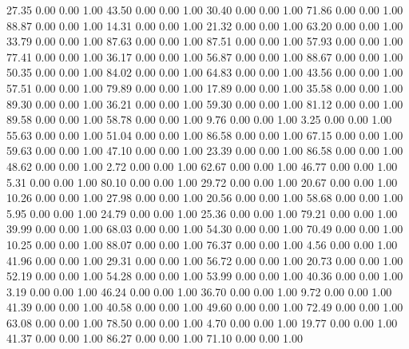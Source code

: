    27.35   0.00   0.00   1.00
   43.50   0.00   0.00   1.00
   30.40   0.00   0.00   1.00
   71.86   0.00   0.00   1.00
   88.87   0.00   0.00   1.00
   14.31   0.00   0.00   1.00
   21.32   0.00   0.00   1.00
   63.20   0.00   0.00   1.00
   33.79   0.00   0.00   1.00
   87.63   0.00   0.00   1.00
   87.51   0.00   0.00   1.00
   57.93   0.00   0.00   1.00
   77.41   0.00   0.00   1.00
   36.17   0.00   0.00   1.00
   56.87   0.00   0.00   1.00
   88.67   0.00   0.00   1.00
   50.35   0.00   0.00   1.00
   84.02   0.00   0.00   1.00
   64.83   0.00   0.00   1.00
   43.56   0.00   0.00   1.00
   57.51   0.00   0.00   1.00
   79.89   0.00   0.00   1.00
   17.89   0.00   0.00   1.00
   35.58   0.00   0.00   1.00
   89.30   0.00   0.00   1.00
   36.21   0.00   0.00   1.00
   59.30   0.00   0.00   1.00
   81.12   0.00   0.00   1.00
   89.58   0.00   0.00   1.00
   58.78   0.00   0.00   1.00
    9.76   0.00   0.00   1.00
    3.25   0.00   0.00   1.00
   55.63   0.00   0.00   1.00
   51.04   0.00   0.00   1.00
   86.58   0.00   0.00   1.00
   67.15   0.00   0.00   1.00
   59.63   0.00   0.00   1.00
   47.10   0.00   0.00   1.00
   23.39   0.00   0.00   1.00
   86.58   0.00   0.00   1.00
   48.62   0.00   0.00   1.00
    2.72   0.00   0.00   1.00
   62.67   0.00   0.00   1.00
   46.77   0.00   0.00   1.00
    5.31   0.00   0.00   1.00
   80.10   0.00   0.00   1.00
   29.72   0.00   0.00   1.00
   20.67   0.00   0.00   1.00
   10.26   0.00   0.00   1.00
   27.98   0.00   0.00   1.00
   20.56   0.00   0.00   1.00
   58.68   0.00   0.00   1.00
    5.95   0.00   0.00   1.00
   24.79   0.00   0.00   1.00
   25.36   0.00   0.00   1.00
   79.21   0.00   0.00   1.00
   39.99   0.00   0.00   1.00
   68.03   0.00   0.00   1.00
   54.30   0.00   0.00   1.00
   70.49   0.00   0.00   1.00
   10.25   0.00   0.00   1.00
   88.07   0.00   0.00   1.00
   76.37   0.00   0.00   1.00
    4.56   0.00   0.00   1.00
   41.96   0.00   0.00   1.00
   29.31   0.00   0.00   1.00
   56.72   0.00   0.00   1.00
   20.73   0.00   0.00   1.00
   52.19   0.00   0.00   1.00
   54.28   0.00   0.00   1.00
   53.99   0.00   0.00   1.00
   40.36   0.00   0.00   1.00
    3.19   0.00   0.00   1.00
   46.24   0.00   0.00   1.00
   36.70   0.00   0.00   1.00
    9.72   0.00   0.00   1.00
   41.39   0.00   0.00   1.00
   40.58   0.00   0.00   1.00
   49.60   0.00   0.00   1.00
   72.49   0.00   0.00   1.00
   63.08   0.00   0.00   1.00
   78.50   0.00   0.00   1.00
    4.70   0.00   0.00   1.00
   19.77   0.00   0.00   1.00
   41.37   0.00   0.00   1.00
   86.27   0.00   0.00   1.00
   71.10   0.00   0.00   1.00
